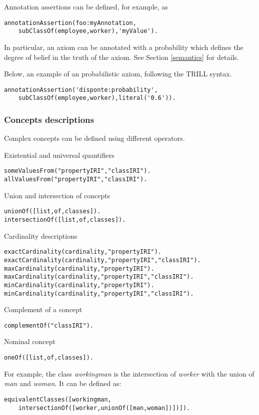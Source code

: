 Annotation assertions can be defined, for example, as
\begin{verbatim}
annotationAssertion(foo:myAnnotation,
    subClassOf(employee,worker),'myValue').
\end{verbatim}


In particular, an axiom can be annotated with a probability which defines the degree of belief in the truth of the axiom. See Section \ref{semantics} for details.


Below, an example of an probabilistic axiom, following the TRILL syntax.
\begin{verbatim}
annotationAssertion('disponte:probability',
    subClassOf(employee,worker),literal('0.6')).
\end{verbatim}

\subsubsection{Concepts descriptions}
Complex concepts can be defined using different operators.

Existential and universal quantifiers
\begin{verbatim}
someValuesFrom("propertyIRI","classIRI").
allValuesFrom("propertyIRI","classIRI").
\end{verbatim}
Union and intersection of concepts
\begin{verbatim}
unionOf([list,of,classes]).
intersectionOf([list,of,classes]).
\end{verbatim}
Cardinality descriptions
\begin{verbatim}
exactCardinality(cardinality,"propertyIRI").
exactCardinality(cardinality,"propertyIRI","classIRI").
maxCardinality(cardinality,"propertyIRI").
maxCardinality(cardinality,"propertyIRI","classIRI").
minCardinality(cardinality,"propertyIRI").
minCardinality(cardinality,"propertyIRI","classIRI").
\end{verbatim}
Complement of a concept
\begin{verbatim}
complementOf("classIRI").
\end{verbatim}
Nominal concept
\begin{verbatim}
oneOf([list,of,classes]).
\end{verbatim}
For example, the class \textit{workingman} is the intersection of \textit{worker} with the union of \textit{man} and \textit{woman}. It can be defined as:
\begin{verbatim}
equivalentClasses([workingman,
    intersectionOf([worker,unionOf([man,woman])])]).
\end{verbatim}

